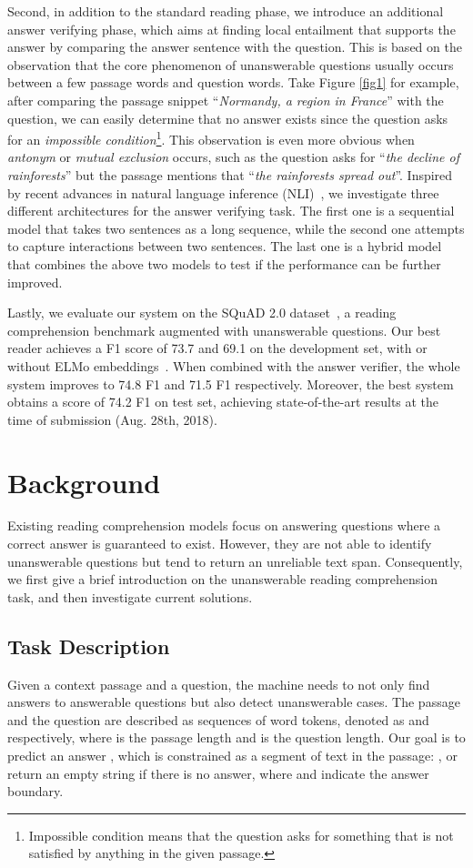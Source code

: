 \documentclass[letterpaper]{article} \usepackage{aaai19}  \usepackage{times}  \usepackage{helvet}  \usepackage{courier}  \usepackage{url}  \usepackage{graphicx}  \usepackage{pbox}
\begin{document}
Second, in addition to the standard reading phase, we introduce an additional answer verifying phase, which aims at finding local entailment that supports the answer by comparing the answer sentence with the question.
This is based on the observation that the core phenomenon of unanswerable questions usually occurs between a few passage words and question words.
Take Figure \ref{fig1} for example, after comparing the passage snippet ``\emph{Normandy, a region in France}'' with the question, we can easily determine that no answer exists since the question asks for an \emph{impossible condition}\footnote{Impossible condition means that the question asks for something that is not satisfied by anything in the given passage.}.
This observation is even more obvious when \emph{antonym} or \emph{mutual exclusion} occurs, such as the question asks for ``\emph{the decline of rainforests}'' but the passage mentions that ``\emph{the rainforests spread out}''.
Inspired by recent advances in natural language inference (NLI)~\cite{Bowman15}, we investigate three different architectures for the answer verifying task.
The first one is a sequential model that takes two sentences as a long sequence, while the second one attempts to capture interactions between two sentences.
The last one is a hybrid model that combines the above two models to test if the performance can be further improved.

Lastly, we evaluate our system on the SQuAD 2.0 dataset~\cite{Rajpurkar18}, a reading comprehension benchmark augmented with unanswerable questions. Our best reader achieves a F1 score of 73.7 and 69.1 on the development set, with or without ELMo embeddings~\cite{Elmo17}.
When combined with the answer verifier, the whole system improves to 74.8 F1 and 71.5 F1 respectively.
Moreover, the best system obtains a score of 74.2 F1 on test set, achieving state-of-the-art results at the time of submission (Aug. 28th, 2018).
 \section{Background}
Existing reading comprehension models focus on answering questions where a correct answer is guaranteed to exist.
However, they are not able to identify unanswerable questions but tend to return an unreliable text span.
Consequently, we first give a brief introduction on the unanswerable reading comprehension task, and then investigate current solutions.

\subsection{Task Description}
Given a context passage and a question, the machine needs to not only find answers to answerable questions but also detect unanswerable cases. 
The passage and the question are described as sequences of word tokens, denoted as  and  respectively, where  is the passage length and  is the question length. 
Our goal is to predict an answer , which is constrained as a segment of text in the passage: , or return an empty string if there is no answer, where  and  indicate the answer boundary. 
\end{document}
